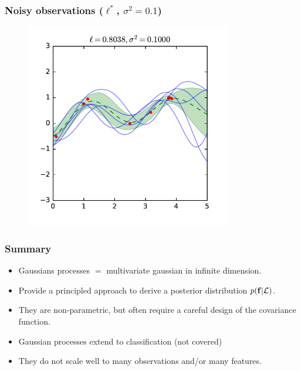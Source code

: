 \documentclass{beamer}
\begin{document}
\begin{frame}
    \frametitle{Noisy observations ($\ell^*$, $\sigma^2=0.1$)}

    \begin{figure}
        \centering
        \includegraphics[width=0.8\textwidth]{./figures/rbf-noise.pdf}
    \end{figure}
\end{frame}


\begin{frame}
    \frametitle{Summary}

    \begin{itemize}
        \item Gaussians processes $=$ multivariate gaussian in infinite dimension.
        \item Provide a principled approach to derive a posterior distribution $p(\mathbf{f}|{\cal L})$.
        \item They are non-parametric, but often require a careful design of the covariance function.
        \item Gaussian processes extend to classification (not covered)
        \item They do not scale well to many observations and/or many features.
    \end{itemize}
\end{frame}
\end{document}
